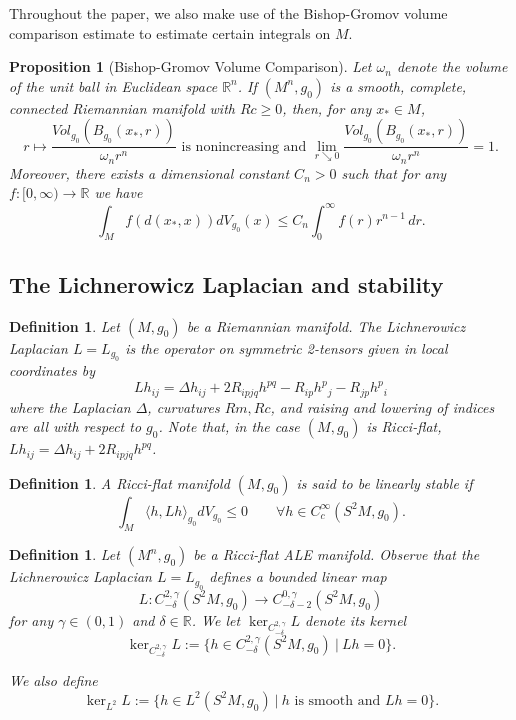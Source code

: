 \documentclass[12pt]{amsart}
\renewcommand{\1}{{\mathbf 1}}
\newcommand{\R}{{\mathbb R}}
\newtheorem{prop}[thm]{Proposition}
\theoremstyle{others}
\newtheorem{defn}[thm]{Definition}
\numberwithin{equation}{section}
\begin{document}
Throughout the paper, we also make use of the Bishop-Gromov volume comparison estimate to estimate certain integrals on $M$.
\begin{prop}[Bishop-Gromov Volume Comparison]
    Let $\omega_n$ denote the volume of the unit ball in Euclidean space $\R^n$.
    If $(M^n, g_0)$ is a smooth, complete, connected Riemannian manifold with $Rc \ge 0 $, then, for any $x_* \in M$,
        $$r \mapsto \frac{Vol_{g_0} ( B_{g_0}(x_*, r) ) }{\omega_n r^n} \text{ is nonincreasing and } \lim_{r \searrow 0} \frac{Vol_{g_0} ( B_{g_0}(x_*, r) ) }{\omega_n r^n} = 1.$$
    Moreover, there exists a dimensional constant $C_n > 0$ such that for any $f : [0, \infty) \to \R$ we have
        $$\int_M f( d(x_*, x) ) dV_{g_0}(x) \le C_n \int_0^\infty f(r) r^{n-1}\, dr.$$
\end{prop}


\vspace{2mm}

\subsection{The Lichnerowicz Laplacian and stability} \label{subsect Lich Laplacian and stability}

\begin{defn}
    Let $(M, g_0)$ be a Riemannian manifold.
    The \emph{Lichnerowicz Laplacian} $L = L_{g_0}$ is the operator on symmetric 2-tensors given in local coordinates by
        $$Lh_{ij} = \Delta h_{ij} + 2 R_{ipjq} h^{pq} - R_{ip} h^p{}_j - R_{jp} h^p{}_i $$
    where the Laplacian $\Delta$, curvatures $Rm, Rc$, and raising and lowering of indices are all with respect to $g_0$.
    Note that, in the case $(M, g_0)$ is Ricci-flat, $Lh_{ij} = \Delta h_{ij} + 2 R_{ipjq} h^{pq}$.
\end{defn}

\begin{defn} \label{defn linearly stable}
    A Ricci-flat manifold $(M, g_0)$ is said to be \emph{linearly stable} if 
        $$\int_M \langle h, Lh \rangle_{g_0} dV_{g_0} \le 0 \qquad \forall  h \in C^\infty_c(S^2M, g_0) .$$
\end{defn}

\begin{defn}
    Let $(M^n, g_0)$ be a Ricci-flat ALE manifold.
    Observe that the Lichnerowicz Laplacian $L= L_{g_0}$ defines a bounded linear map
        $$L : C^{2, \gamma}_{-\delta}(S^2M, g_0) \to C^{0, \gamma}_{-\delta-2}(S^2 M, g_0)$$
    for any $\gamma \in (0,1)$ and $\delta \in \R$.
    We let $\ker_{C^{2, \gamma}_{-\delta}} L $ denote its kernel
        $$\ker_{C^{2, \gamma}_{-\delta}} L := \{ h \in C^{2, \gamma}_{-\delta}(S^2 M, g_0) \ | \ Lh = 0 \} .$$    

    We also define 
        $$\ker_{L^2} L := \{ h \in L^2(S^2M, g_0) \ | \ h \text{ is smooth and } Lh=0 \}.$$
\end{defn}
\end{document}

